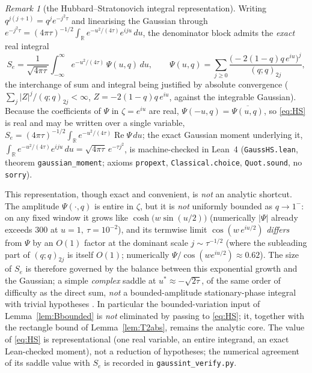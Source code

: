\documentclass[11pt]{article}
\theoremstyle{plain}
\theoremstyle{definition}
\theoremstyle{remark}
\newtheorem{remark}[theorem]{Remark}
\newcommand{\R}{\mathbb{R}}
\renewcommand{\Re}{\operatorname{Re}}
\begin{document}
\begin{remark}[the Hubbard--Stratonovich integral representation]\label{rem:gaussint}
Writing $q^{j(j+1)}=q^{j}e^{-j^2\tau}$ and linearising the Gaussian through
$e^{-j^2\tau}=(4\pi\tau)^{-1/2}\int_{\R}e^{-u^2/(4\tau)}e^{iju}\,du$, the denominator block admits the
\emph{exact} real integral
\begin{equation}\label{eq:HS}
   S_e=\frac1{\sqrt{4\pi\tau}}\int_{-\infty}^{\infty}e^{-u^2/(4\tau)}\,\Psi(u,q)\,du,
   \qquad
   \Psi(u,q)=\sum_{j\ge0}\frac{\bigl(-2(1-q)q\,e^{iu}\bigr)^{j}}{(q;q)_{2j}},
\end{equation}
the interchange of sum and integral being justified by absolute convergence
($\sum_j|Z|^{j}/(q;q)_{2j}<\infty$, $Z=-2(1-q)q\,e^{iu}$, against the integrable Gaussian). Because the
coefficients of $\Psi$ in $\zeta=e^{iu}$ are real, $\Psi(-u,q)=\overline{\Psi(u,q)}$, so \eqref{eq:HS}
is real and may be written over a single variable, $S_e=(4\pi\tau)^{-1/2}\!\int_\R
e^{-u^2/(4\tau)}\Re\Psi\,du$; the exact Gaussian moment underlying it,
$\int_{\R}e^{-u^2/(4\tau)}e^{iju}\,du=\sqrt{4\pi\tau}\,e^{-\tau j^2}$, is machine-checked in Lean~4
(\texttt{GaussHS.lean}, theorem \texttt{gaussian\_moment}; axioms \texttt{propext},
\texttt{Classical.choice}, \texttt{Quot.sound}, no \texttt{sorry}).

This representation, though exact and convenient, is \emph{not} an analytic shortcut. The amplitude $\Psi(\cdot,q)$ is entire in $\zeta$, but it is
\emph{not} uniformly bounded as $q\to1^-$: on any fixed window it grows like $\cosh\!\bigl(w\sin(u/2)\bigr)$
(numerically $|\Psi|$ already exceeds $300$ at $u=1,\ \tau=10^{-2}$), and its termwise limit
$\cos(w\,e^{iu/2})$ \emph{differs} from $\Psi$ by an $O(1)$ factor at the dominant scale $j\sim\tau^{-1/2}$
(where the subleading part of $(q;q)_{2j}$ is itself $O(1)$; numerically $\Psi/\cos(we^{iu/2})\approx0.62$).
The size of $S_e$ is therefore governed by the balance between this exponential growth and the Gaussian; a
simple \emph{complex} saddle at $u^\ast\approx-\sqrt{2\tau}$, of the same order of difficulty as the direct
sum, \emph{not} a bounded-amplitude stationary-phase integral with trivial hypotheses
\cite[Ch.~II]{Wong}. In particular the
bounded-variation input of Lemma~\ref{lem:Bbounded} is \emph{not} eliminated by passing to \eqref{eq:HS};
it, together with the rectangle bound of Lemma~\ref{lem:T2abs}, remains the analytic core. The value
of \eqref{eq:HS} is representational (one real variable, an entire integrand, an exact Lean-checked moment),
not a reduction of hypotheses; the numerical agreement of its saddle value with $S_e$ is recorded in
\texttt{gaussint\_verify.py}.
\end{remark}
\end{document}
